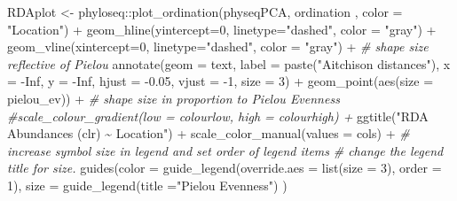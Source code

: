 \documentclass[
]{book}
\newenvironment{Shaded}{\begin{snugshade}}{\end{snugshade}}
\newcommand{\AttributeTok}[1]{\textcolor[rgb]{0.77,0.63,0.00}{#1}}
\newcommand{\CommentTok}[1]{\textcolor[rgb]{0.56,0.35,0.01}{\textit{#1}}}
\newcommand{\ConstantTok}[1]{\textcolor[rgb]{0.00,0.00,0.00}{#1}}
\newcommand{\DecValTok}[1]{\textcolor[rgb]{0.00,0.00,0.81}{#1}}
\newcommand{\FloatTok}[1]{\textcolor[rgb]{0.00,0.00,0.81}{#1}}
\newcommand{\FunctionTok}[1]{\textcolor[rgb]{0.00,0.00,0.00}{#1}}
\newcommand{\NormalTok}[1]{#1}
\newcommand{\OtherTok}[1]{\textcolor[rgb]{0.56,0.35,0.01}{#1}}
\newcommand{\SpecialCharTok}[1]{\textcolor[rgb]{0.00,0.00,0.00}{#1}}
\newcommand{\StringTok}[1]{\textcolor[rgb]{0.31,0.60,0.02}{#1}}
\begin{document}
\begin{Shaded}
\begin{Highlighting}[]
\NormalTok{RDAplot }\OtherTok{\textless{}{-}}\NormalTok{ phyloseq}\SpecialCharTok{::}\FunctionTok{plot\_ordination}\NormalTok{(physeqPCA, ordination , }
                                \AttributeTok{color =} \StringTok{"Location"}\NormalTok{)  }\SpecialCharTok{+}
  \FunctionTok{geom\_hline}\NormalTok{(}\AttributeTok{yintercept=}\DecValTok{0}\NormalTok{, }\AttributeTok{linetype=}\StringTok{"dashed"}\NormalTok{, }\AttributeTok{color =} \StringTok{"gray"}\NormalTok{) }\SpecialCharTok{+}
  \FunctionTok{geom\_vline}\NormalTok{(}\AttributeTok{xintercept=}\DecValTok{0}\NormalTok{, }\AttributeTok{linetype=}\StringTok{"dashed"}\NormalTok{, }\AttributeTok{color =} \StringTok{"gray"}\NormalTok{) }\SpecialCharTok{+}    \CommentTok{\# shape size reflective of Pielou  }
     \FunctionTok{annotate}\NormalTok{(}\AttributeTok{geom =} \StringTok{\textquotesingle{}text\textquotesingle{}}\NormalTok{, }\AttributeTok{label =} \FunctionTok{paste}\NormalTok{(}\StringTok{"Aitchison distances"}\NormalTok{), }
             \AttributeTok{x =} \SpecialCharTok{{-}}\ConstantTok{Inf}\NormalTok{, }\AttributeTok{y =} \SpecialCharTok{{-}}\ConstantTok{Inf}\NormalTok{, }\AttributeTok{hjust =} \SpecialCharTok{{-}}\FloatTok{0.05}\NormalTok{, }\AttributeTok{vjust =} \SpecialCharTok{{-}}\DecValTok{1}\NormalTok{, }\AttributeTok{size =} \DecValTok{3}\NormalTok{) }\SpecialCharTok{+}
  \FunctionTok{geom\_point}\NormalTok{(}\FunctionTok{aes}\NormalTok{(}\AttributeTok{size =}\NormalTok{ pielou\_ev)) }\SpecialCharTok{+}        \CommentTok{\# shape size in proportion to Pielou Evenness}
  \CommentTok{\#scale\_colour\_gradient(low = colourlow, high = colourhigh) +}
  \FunctionTok{ggtitle}\NormalTok{(}\StringTok{"RDA Abundances (clr) \textasciitilde{} Location"}\NormalTok{) }\SpecialCharTok{+}
  \FunctionTok{scale\_color\_manual}\NormalTok{(}\AttributeTok{values =}\NormalTok{ cols) }\SpecialCharTok{+} 
\CommentTok{\# increase symbol size in legend and set order of legend items}
\CommentTok{\# change the legend title for \textasciigrave{}size\textasciigrave{}.}
     \FunctionTok{guides}\NormalTok{(}\AttributeTok{color =} \FunctionTok{guide\_legend}\NormalTok{(}\AttributeTok{override.aes =} \FunctionTok{list}\NormalTok{(}\AttributeTok{size =} \DecValTok{3}\NormalTok{), }\AttributeTok{order =} \DecValTok{1}\NormalTok{), }
            \AttributeTok{size =} \FunctionTok{guide\_legend}\NormalTok{(}\AttributeTok{title =}\StringTok{"Pielou Evenness"}\NormalTok{) ) }




\end{Highlighting}
\end{Shaded}
\end{document}
